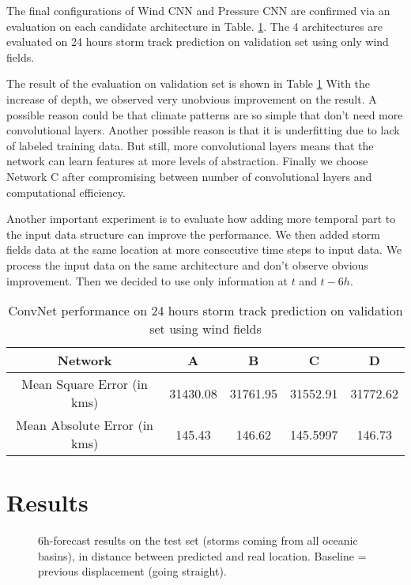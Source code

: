 The final configurations of Wind CNN and Pressure CNN are confirmed via an evaluation on each candidate architecture in Table. \ref{table:arch_evaluation}. The 4 architectures are evaluated on 24 hours storm track prediction on validation set using only wind fields.




The result of the evaluation on validation set is shown in Table \ref{table:arch_evaluation} With the increase of depth, we observed very unobvious improvement on the result. A possible reason could be that climate patterns are so simple that don't need more convolutional layers. Another possible reason is that it is underfitting due to lack of labeled training data. But still, more convolutional layers means that the network can learn features at more levels of abstraction. Finally we choose Network C after compromising between number of convolutional layers and computational efficiency.

Another important experiment is to evaluate how adding more temporal part to the input data structure can improve the performance. We then added storm fields data at the same location at more consecutive time steps to input data. We process the input data on the same architecture and don't observe obvious improvement. Then we decided to use only information at $t$ and $t-6h$. 

\begin{table}[]
	\centering
	\caption{ConvNet performance on 24 hours storm track prediction on validation set using wind fields}
	\label{table:arch_evaluation}
	\begin{tabular}{|c|c|c|c|c|}
		\hline
		Network & A & B & C & D \\ \hline
		Mean Square Error (in kms) & 31430.08 & 31761.95 & 31552.91 & 31772.62 \\ \hline
		Mean Absolute Error (in kms) & 145.43 & 146.62 & 145.5997 & 146.73 \\ \hline
	\end{tabular}
\end{table}





\section{Results}

\begin{figure}
	\begin{center}
		\hsize {}
	\end{center}
	\caption{6h-forecast results on the test set (storms coming from all oceanic basins), in distance between predicted and real location. Baseline = previous displacement (going straight).}
	\label{fig:boxplots}
\end{figure}

